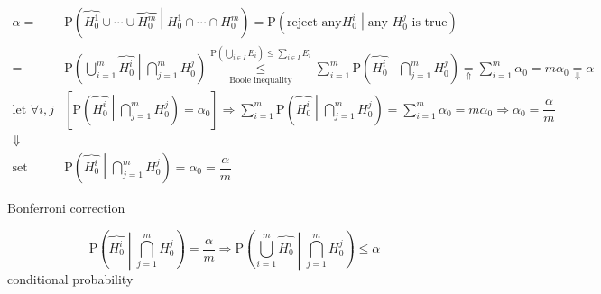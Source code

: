\documentclass[
]{book}
\theoremstyle{definition}
\theoremstyle{definition}
\theoremstyle{definition}
\theoremstyle{definition}
\theoremstyle{remark}
\begin{document}
\[
\begin{aligned}
\alpha= & \mathrm{P}\left(\overbrace{H_{{\scriptscriptstyle 0}}^{{\scriptscriptstyle 1}}}\cup\cdots\cup\overbrace{H_{{\scriptscriptstyle 0}}^{{\scriptscriptstyle m}}}\middle|H_{{\scriptscriptstyle 0}}^{{\scriptscriptstyle 1}}\cap\cdots\cap H_{{\scriptscriptstyle 0}}^{{\scriptscriptstyle m}}\right)=\mathrm{P}\left(\text{reject any}H_{{\scriptscriptstyle 0}}^{{\scriptscriptstyle i}}\middle|\text{any }H_{{\scriptscriptstyle 0}}^{{\scriptscriptstyle j}}\text{ is true}\right)\\
= & \mathrm{P}\left(\bigcup\limits _{i=1}^{m}\overbrace{H_{{\scriptscriptstyle 0}}^{{\scriptscriptstyle i}}}\middle|\bigcap\limits _{j=1}^{m}H_{{\scriptscriptstyle 0}}^{{\scriptscriptstyle j}}\right)\overset{\mathrm{P}\left(\bigcup\limits _{i\in I}E_{{\scriptscriptstyle i}}\right)\le\sum\limits _{i\in I}E_{{\scriptscriptstyle i}}}{\underset{\text{Boole inequality}}{\le}}\sum\limits _{i=1}^{m}\mathrm{P}\left(\overbrace{H_{{\scriptscriptstyle 0}}^{{\scriptscriptstyle i}}}\middle|\bigcap\limits _{j=1}^{m}H_{{\scriptscriptstyle 0}}^{{\scriptscriptstyle j}}\right)\underset{\Uparrow}{=}\sum\limits _{i=1}^{m}\alpha_{{\scriptscriptstyle 0}}=m\alpha_{{\scriptscriptstyle 0}}\underset{\Downarrow}{=}\alpha\\
\text{let }\forall i,j & \left[\mathrm{P}\left(\overbrace{H_{{\scriptscriptstyle 0}}^{{\scriptscriptstyle i}}}\middle|\bigcap\limits _{j=1}^{m}H_{{\scriptscriptstyle 0}}^{{\scriptscriptstyle j}}\right)=\alpha_{{\scriptscriptstyle 0}}\right]\Rightarrow\sum\limits _{i=1}^{m}\mathrm{P}\left(\overbrace{H_{{\scriptscriptstyle 0}}^{{\scriptscriptstyle i}}}\middle|\bigcap\limits _{j=1}^{m}H_{{\scriptscriptstyle 0}}^{{\scriptscriptstyle j}}\right)=\sum\limits _{i=1}^{m}\alpha_{{\scriptscriptstyle 0}}=m\alpha_{{\scriptscriptstyle 0}}\Rightarrow\alpha_{{\scriptscriptstyle 0}}=\dfrac{\alpha}{m}\\
\Downarrow\\
\text{set } & \mathrm{P}\left(\overbrace{H_{{\scriptscriptstyle 0}}^{{\scriptscriptstyle i}}}\middle|\bigcap\limits _{j=1}^{m}H_{{\scriptscriptstyle 0}}^{{\scriptscriptstyle j}}\right)=\alpha_{{\scriptscriptstyle 0}}=\dfrac{\alpha}{m}
\end{aligned}
\]

Bonferroni correction

\[
\mathrm{P}\left(\overbrace{H_{{\scriptscriptstyle 0}}^{{\scriptscriptstyle i}}}\middle|\bigcap\limits _{j=1}^{m}H_{{\scriptscriptstyle 0}}^{{\scriptscriptstyle j}}\right)=\dfrac{\alpha}{m}\Rightarrow\mathrm{P}\left(\bigcup\limits _{i=1}^{m}\overbrace{H_{{\scriptscriptstyle 0}}^{{\scriptscriptstyle i}}}\middle|\bigcap\limits _{j=1}^{m}H_{{\scriptscriptstyle 0}}^{{\scriptscriptstyle j}}\right)\le\alpha
\]
conditional probability
\end{document}
